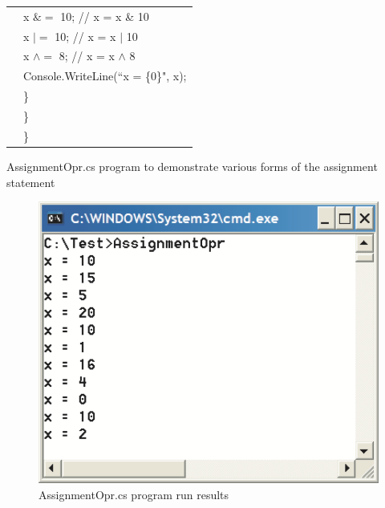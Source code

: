 \begin{program}
\begin{tabular}{>{\codelinenumfont}l>{\codelistingfont}l}
21 &  \hspace{0.6in} x $\&\!=$ 10;    \hspace{0.4in} // x = x \& 10\\
22 &  \hspace{0.6in} x $\vert\!=$ 10;    \hspace{0.4in} // x = x $\vert$ 10\\
23 &  \hspace{0.6in} x $\wedge\!=$ 8;     \hspace{0.4in} // x = x $\wedge$ 8\\
24 &  \hspace{0.6in} Console.WriteLine(``x = \{0\}", x);\\
25 & \hspace{0.4in} \} \\
26 & \hspace{0.2in} \} \\
27 & \} \\

\end{tabular}
\caption{AssignmentOpr.cs program to demonstrate various forms of
the assignment statement} \label{tab:AssignmentOpr}
\end{program}
\renewcommand{\baselinestretch}{1.0}



\begin{figure}
\centering
\includegraphics[scale=0.5]{./CSharpBasics/Illus/AssignmentOprOut}
\caption{AssignmentOpr.cs program run results}
\label{fig:AssignmentOprOut}
\end{figure}


